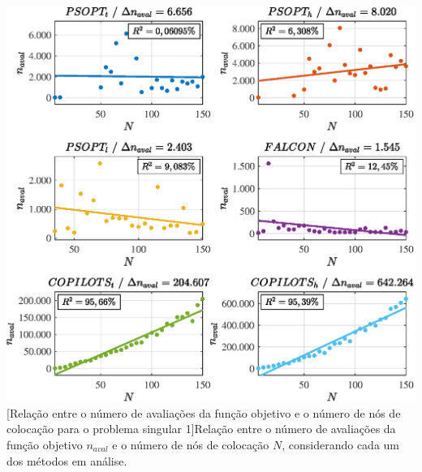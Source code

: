 \noindent
\begin{minipage}{\textwidth}
	\vspace{\onelineskip}
	\centering
	\includegraphics[scale=0.7]{fig/resultados/singular1/sens/eval}
	[Relação entre o número de avaliações da função objetivo e o número de nós de colocação para o problema singular 1]{Relação entre o número de avaliações da função objetivo $ n_{aval} $ e o número de nós de colocação $ N $, considerando cada um dos métodos em análise.}
	\label{fig:singular1:sensibilidade:naval}
	\vspace{\onelineskip}
\end{minipage}


